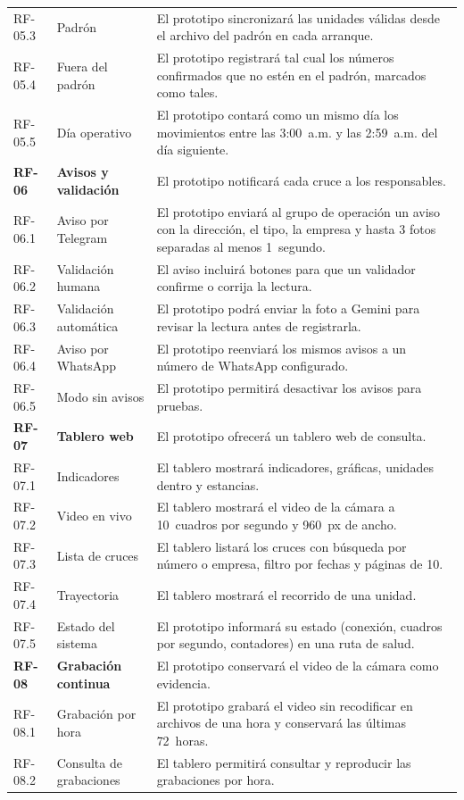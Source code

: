 {\begin{longtable}{@{}L{1.5cm}L{3.6cm}L{8.9cm}@{}}
  RF-05.3 & Padrón & El prototipo sincronizará las unidades válidas desde
    el archivo del padrón en cada arranque. \\
  RF-05.4 & Fuera del padrón & El prototipo registrará tal cual los
    números confirmados que no estén en el padrón, marcados como tales. \\
  RF-05.5 & Día operativo & El prototipo contará como un mismo día los
    movimientos entre las 3:00~a.m. y las 2:59~a.m. del día siguiente. \\
  \midrule
  \textbf{RF-06} & \textbf{Avisos y validación} & El prototipo notificará
    cada cruce a los responsables. \\
  RF-06.1 & Aviso por Telegram & El prototipo enviará al grupo de
    operación un aviso con la dirección, el tipo, la empresa y hasta 3
    fotos separadas al menos 1~segundo. \\
  RF-06.2 & Validación humana & El aviso incluirá botones para que un
    validador confirme o corrija la lectura. \\
  RF-06.3 & Validación automática & El prototipo podrá enviar la foto a
    Gemini para revisar la lectura antes de registrarla. \\
  RF-06.4 & Aviso por WhatsApp & El prototipo reenviará los mismos avisos
    a un número de WhatsApp configurado. \\
  RF-06.5 & Modo sin avisos & El prototipo permitirá desactivar los avisos
    para pruebas. \\
  \midrule
  \textbf{RF-07} & \textbf{Tablero web} & El prototipo ofrecerá un tablero
    web de consulta. \\
  RF-07.1 & Indicadores & El tablero mostrará indicadores, gráficas,
    unidades dentro y estancias. \\
  RF-07.2 & Video en vivo & El tablero mostrará el video de la cámara a
    10~cuadros por segundo y 960~px de ancho. \\
  RF-07.3 & Lista de cruces & El tablero listará los cruces con búsqueda
    por número o empresa, filtro por fechas y páginas de 10. \\
  RF-07.4 & Trayectoria & El tablero mostrará el recorrido de una unidad. \\
  RF-07.5 & Estado del sistema & El prototipo informará su estado
    (conexión, cuadros por segundo, contadores) en una ruta de salud. \\
  \midrule
  \textbf{RF-08} & \textbf{Grabación continua} & El prototipo conservará el
    video de la cámara como evidencia. \\
  RF-08.1 & Grabación por hora & El prototipo grabará el video sin
    recodificar en archivos de una hora y conservará las últimas 72~horas.
    \\
  RF-08.2 & Consulta de grabaciones & El tablero permitirá consultar y
    reproducir las grabaciones por hora. \\
  \bottomrule
\end{longtable}
}

